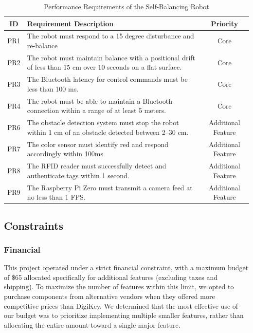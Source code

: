 \documentclass{article}
\begin{document}
\begin{table}[H]
    \centering
    \renewcommand{\arraystretch}{1.3} %
    \begin{tabularx}{\textwidth}{|c|X|c|}
        \hline
        \textbf{ID} & \textbf{Requirement Description} & \textbf{Priority} \\
        \hline
        PR1 & The robot must respond to a 15 degree disturbance and re-balance & Core \\
        \hline
        PR2 & The robot must maintain balance with a positional drift of less than 15 cm over 10 seconds on a flat surface. & Core \\
        \hline
        PR3 & The Bluetooth latency for control commands must be less than 100 ms. & Core \\
        \hline
        PR4 & The robot must be able to maintain a Bluetooth connection within a range of at least 5 meters. & Core \\
        \hline
        PR6 & The obstacle detection system must stop the robot within 1 cm of an obstacle detected between 2–30 cm. & Additional Feature \\
        \hline
        PR7 & The color sensor must identify red and respond accordingly within 100ms & Additional Feature \\
        \hline
        PR8 & The RFID reader must successfully detect and authenticate tags within 1 second. & Additional Feature \\
        \hline
        PR9 & The Raspberry Pi Zero must transmit a camera feed at no less than 1 FPS. & Additional Feature \\
        \hline
    \end{tabularx}
    \caption{Performance Requirements of the Self-Balancing Robot}
    \label{tab:performance_requirements}
\end{table}

\subsection{Constraints}

\subsubsection{Financial}
This project operated under a strict financial constraint, with a maximum budget of \$65 allocated specifically for additional features (excluding taxes and shipping). To maximize the number of features within this limit, we opted to purchase components from alternative vendors when they offered more competitive prices than DigiKey. We determined that the most effective use of our budget was to prioritize implementing multiple smaller features, rather than allocating the entire amount toward a single major feature.
\end{document}
